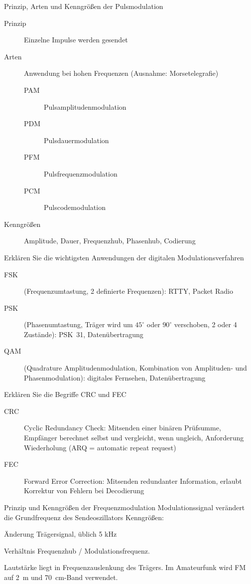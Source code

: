 \documentclass[avery5371,grid,frame,a4paper]{flashcards}
\newcommand{\card}[3]{
  \begin{flashcard}[{\chap} -- #1]{#2}#3\end{flashcard}
}
\begin{document}
\card{46}{Prinzip, Arten und Kenngrößen der Pulsmodulation}{
  \small
  \begin{description}
    \item[Prinzip] Einzelne Impulse werden gesendet
    \item[Arten] Anwendung bei hohen Frequenzen (Ausnahme: Morsetelegrafie)
      \begin{description}
        \item[PAM] Pulsamplitudenmodulation
        \item[PDM] Pulsdauermodulation
        \item[PFM] Pulsfrequenzmodulation
        \item[PCM] Pulscodemodulation
      \end{description}
    \item[Kenngrößen] Amplitude, Dauer, Frequenzhub, Phasenhub, Codierung
  \end{description}
}
\card{47}{Erklären Sie die wichtigsten Anwendungen der digitalen Modulationsverfahren}{
  \begin{description}
    \item[FSK]
      (Frequenzumtastung, 2 definierte Frequenzen):
      RTTY, Packet Radio
    \item[PSK]
      (Phasenumtastung, Träger wird um $45^\circ$ oder $90^\circ$ verschoben, 2 oder 4 Zustände):
      PSK~31, Datenübertragung
    \item[QAM]
      (Quadrature Amplitudenmodulation, Kombination von Amplituden- und Phasenmodulation):
      digitales Fernsehen, Datenübertragung
  \end{description}
}
\card{48}{Erklären Sie die Begriffe CRC und FEC}{
  \begin{description}
    \item[CRC]
      Cyclic Redundancy Check:
      Mitsenden einer binären Prüfsumme,
      Empfänger berechnet selbst und vergleicht,
      wenn ungleich, Anforderung Wiederholung (ARQ = automatic repeat request)
    \item[FEC]
      Forward Error Correction:
      Mitsenden redundanter Information,
      erlaubt Korrektur von Fehlern bei Decodierung
  \end{description}
}
\card{49}{Prinzip und Kenngrößen der Frequenzmodulation}{
  Modulationssignal verändert die Grundfrequenz des Sendeoszillators
  Kenngrößen:
  \begin{description}\itemsep0pt
    \item[Frequenzhub in \SI{}{\kilo\Hz}] Änderung Trägersignal, üblich 5 kHz
    \item[Modulationsindex] Verhältnis Frequenzhub / Modulationsfrequenz.
  \end{description}
  Lautstärke liegt in Frequenzauslenkung des Trägers.
  Im Amateurfunk wird FM auf \SI{2}{\metre} und \SI{70}{\centi\metre}-Band verwendet.
}
\end{document}
